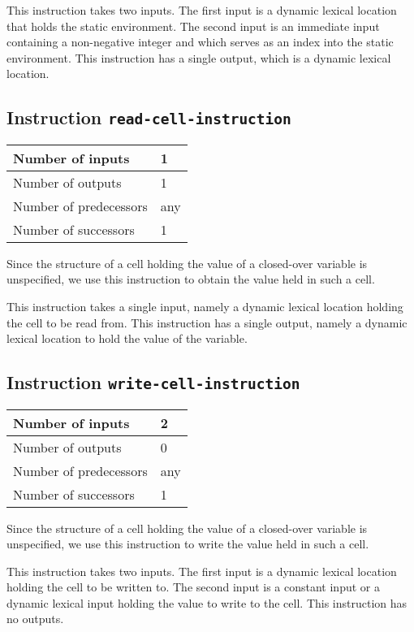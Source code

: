This instruction takes two inputs.  The first input is a dynamic
lexical location that holds the static environment.  The second input
is an immediate input containing a non-negative integer and which
serves as an index into the static environment.  This instruction has
a single output, which is a dynamic lexical location.

\subsection{Instruction \texttt{read-cell-instruction}}
\label{hir-instruction-read-cell}

\begin{tabular}{|l|l|}
\hline
Number of inputs & 1\\
\hline
Number of outputs & 1\\
\hline
Number of predecessors & any\\
\hline
Number of successors & 1\\
\hline
\end{tabular}

Since the structure of a cell holding the value of a closed-over
variable is unspecified, we use this instruction to obtain the value
held in such a cell.

This instruction takes a single input, namely a dynamic lexical
location holding the cell to be read from.  This instruction has a
single output, namely a dynamic lexical location to hold the value of
the variable.

\subsection{Instruction \texttt{write-cell-instruction}}
\label{hir-instruction-write-cell}

\begin{tabular}{|l|l|}
\hline
Number of inputs & 2\\
\hline
Number of outputs & 0\\
\hline
Number of predecessors & any\\
\hline
Number of successors & 1\\
\hline
\end{tabular}

Since the structure of a cell holding the value of a closed-over
variable is unspecified, we use this instruction to write the value
held in such a cell.

This instruction takes two inputs. The first input is a dynamic
lexical location holding the cell to be written to.  The second input
is a constant input or a dynamic lexical input holding the value to
write to the cell.  This instruction has no outputs.

